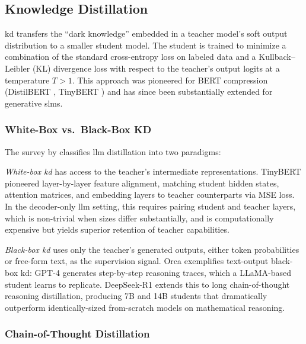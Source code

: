 \subsection{Knowledge Distillation}
\label{subsec:compression_kd}

\gls{kd} \citep{hinton2015distilling} transfers the ``dark knowledge'' embedded in a teacher model's soft output distribution to a smaller student model. The student is trained to minimize a combination of the standard cross-entropy loss on labeled data and a Kullback--Leibler (KL) divergence loss with respect to the teacher's output logits at a temperature $T > 1$. This approach was pioneered for BERT compression (DistilBERT \citep{sanh2019distilbert}, TinyBERT \citep{jiao2020tinybert}) and has since been substantially extended for generative \glspl{slm}.

\subsubsection{White-Box vs.\ Black-Box KD}

The survey by \citet{yang2024kd_survey} classifies \gls{llm} distillation into two paradigms:

\emph{White-box \gls{kd}} has access to the teacher's intermediate representations. TinyBERT \citep{jiao2020tinybert} pioneered layer-by-layer feature alignment, matching student hidden states, attention matrices, and embedding layers to teacher counterparts via MSE loss. In the decoder-only \gls{llm} setting, this requires pairing student and teacher layers, which is non-trivial when sizes differ substantially, and is computationally expensive but yields superior retention of teacher capabilities.

\emph{Black-box \gls{kd}} uses only the teacher's generated outputs, either token probabilities or free-form text, as the supervision signal. Orca \citep{ho2022orca} exemplifies text-output black-box \gls{kd}: GPT-4 generates step-by-step reasoning traces, which a LLaMA-based student learns to replicate. DeepSeek-R1 \citep{deepseek2025r1} extends this to long chain-of-thought reasoning distillation, producing 7B and 14B students that dramatically outperform identically-sized from-scratch models on mathematical reasoning.

\subsubsection{Chain-of-Thought Distillation}


